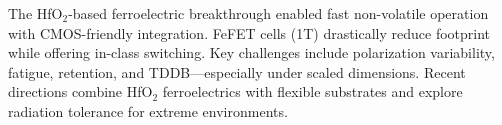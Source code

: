 The HfO$_2$-based ferroelectric breakthrough enabled fast non-volatile operation with CMOS-friendly integration. 
FeFET cells (1T) drastically reduce footprint while offering in-class switching. 
Key challenges include polarization variability, fatigue, retention, and TDDB---especially under scaled dimensions.
Recent directions combine HfO$_2$ ferroelectrics with flexible substrates and explore radiation tolerance for extreme environments.
